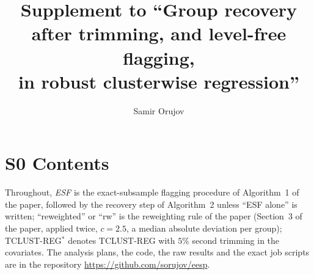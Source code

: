 \documentclass[11pt,a4paper]{article}
\title{Supplement to ``Group recovery after trimming, and level-free flagging,\\ in robust clusterwise regression''}
\author{Samir Orujov}
\date{}
\begin{document}
\maketitle

\section*{S0 Contents}

Throughout, \emph{ESF} is the exact-subsample flagging procedure of Algorithm~1 of the paper,
followed by the recovery step of Algorithm~2 unless ``ESF alone'' is written; ``reweighted''
or ``rw'' is the reweighting rule of the paper (Section~3 of the paper, applied twice,
$c=2.5$, a median absolute deviation per group); TCLUST-REG$^{\ast}$ denotes TCLUST-REG with
$5\%$ second trimming in the covariates. The analysis plans, the code, the raw results and the
exact job scripts are in the repository \url{https://github.com/sorujov/eesp}.
\end{document}
